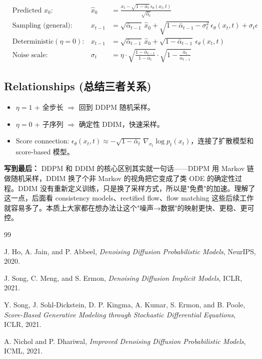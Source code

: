 \documentclass[11pt,a4paper]{article}
\theoremstyle{definition}
\newcommand{\alphat}{\bar{\alpha}_t}
\begin{document}
\begin{align}
    &\text{Predicted } x_0:   & \hat{x}_0                     &= \frac{x_t - \sqrt{1 - \alphat}\,\epsilon_\theta(x_t, t)}{\sqrt{\alphat}} \\[4pt]
    &\text{Sampling (general):} & x_{t-1}                     &= \sqrt{\bar{\alpha}_{t-1}}\,\hat{x}_0
                                                                + \sqrt{1 - \bar{\alpha}_{t-1} - \sigma_t^2}\,\epsilon_\theta(x_t, t)
                                                                + \sigma_t \epsilon \\[4pt]
    &\text{Deterministic} (\eta=0): & x_{t-1}                 &= \sqrt{\bar{\alpha}_{t-1}}\,\hat{x}_0 + \sqrt{1 - \bar{\alpha}_{t-1}}\,\epsilon_\theta(x_t, t) \\[4pt]
    &\text{Noise scale:}      & \sigma_t                      &= \eta \cdot \sqrt{\frac{1-\bar{\alpha}_{t-1}}{1-\alphat}} \cdot \sqrt{1 - \frac{\alphat}{\bar{\alpha}_{t-1}}}
\end{align}

\subsection*{Relationships (总结三者关系)}

\begin{itemize}
    \item $\eta = 1$ + 全步长 $\Rightarrow$ 回到 DDPM 随机采样。
    \item $\eta = 0$ + 子序列 $\Rightarrow$ 确定性 DDIM，快速采样。
    \item Score connection: $\epsilon_\theta(x_t, t) \approx -\sqrt{1-\alphat}\,\nabla_{x_t}\log p_t(x_t)$，连接了扩散模型和 score-based 模型。
\end{itemize}

\medskip
\textbf{写到最后：} DDPM 和 DDIM 的核心区别其实就一句话——DDPM 用 Markov 链做随机采样，DDIM 换了个非 Markov 的视角把它变成了类 ODE 的确定性过程。DDIM 没有重新定义训练，只是换了采样方式，所以是"免费"的加速。理解了这一点，后面看 consistency models、rectified flow、flow matching 这些后续工作就容易多了。本质上大家都在想办法让这个"噪声→数据"的映射更快、更稳、更可控。


\begin{thebibliography}{99}

J. Ho, A. Jain, and P. Abbeel,
\textit{Denoising Diffusion Probabilistic Models},
NeurIPS, 2020.

J. Song, C. Meng, and S. Ermon,
\textit{Denoising Diffusion Implicit Models},
ICLR, 2021.

Y. Song, J. Sohl-Dickstein, D. P. Kingma, A. Kumar, S. Ermon, and B. Poole,
\textit{Score-Based Generative Modeling through Stochastic Differential Equations},
ICLR, 2021.

A. Nichol and P. Dhariwal,
\textit{Improved Denoising Diffusion Probabilistic Models},
ICML, 2021.

\end{thebibliography}
\end{document}
